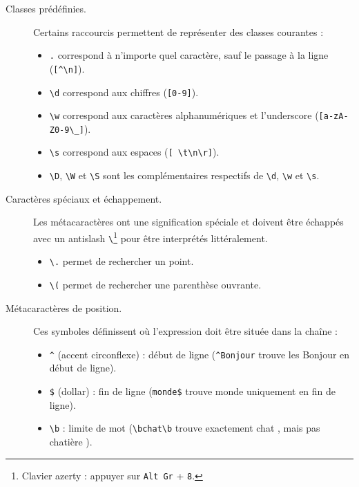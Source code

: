 \documentclass{td}
\begin{document}
\begin{description}
\item[Classes prédéfinies.] Certains raccourcis permettent de représenter des classes courantes :
  \begin{itemize}
  \item \lstinline{.} correspond à n'importe quel caractère, sauf le passage à la ligne (\lstinline{[^\n]}).
  \item \lstinline{\d} correspond aux chiffres (\lstinline{[0-9]}).
  \item \lstinline{\w} correspond aux caractères alphanumériques et l'underscore (\lstinline{[a-zA-Z0-9\_]}).
  \item \lstinline{\s} correspond aux espaces (\lstinline{[ \t\n\r]}).
  \item \lstinline{\D}, \lstinline{\W} et \lstinline{\S} sont les complémentaires respectifs de \lstinline{\d}, \lstinline{\w} et \lstinline{\s}.
  \end{itemize}

\item[Caractères spéciaux et échappement.]
  Les métacaractères ont une signification spéciale et doivent être échappés avec un antislash \lstinline{\}\footnote{Clavier azerty : appuyer sur \texttt{Alt Gr} + \texttt{8}.} pour être interprétés littéralement.
    \begin{itemize}
    \item \lstinline{\.} permet de rechercher un point.
    \item \lstinline{\(} permet de rechercher une parenthèse ouvrante.
    \end{itemize}

  \item[Métacaractères de position.] Ces symboles définissent où l'expression doit être située dans la chaîne :
    \begin{itemize}
    \item \lstinline{^} (accent circonflexe) : début de ligne (\lstinline{^Bonjour} trouve les \og Bonjour \fg{} en début de ligne).
    \item \lstinline{$} (dollar) : fin de ligne (\lstinline{monde$} trouve \og monde \fg{} uniquement en fin de ligne).
    \item \lstinline{\b} : limite de mot (\lstinline{\bchat\b} trouve exactement \og chat \fg, mais pas \og chatière \fg).
    \end{itemize}


\end{description}
\end{document}
